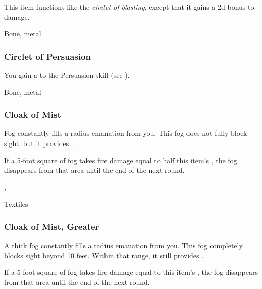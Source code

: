 This item functions like the \textit{circlet of blasting}, except that it gains a \plus2d bonus to damage.



 


 Bone, metal


\lowercase{\hypertarget{item:Circlet of Persuasion}{}}\label{item:Circlet of Persuasion}
\hypertarget{item:Circlet of Persuasion}{\subsubsection{Circlet of Persuasion\hfill{}}}

You gain a   to the Persuasion skill (see ).



 Bone, metal


\lowercase{\hypertarget{item:Cloak of Mist}{}}\label{item:Cloak of Mist}
\hypertarget{item:Cloak of Mist}{\subsubsection{Cloak of Mist\hfill{}}}

Fog constantly fills a \areamed radius emanation from you.
This fog does not fully block sight, but it provides \concealment.

If a 5-foot square of fog takes fire damage equal to half this item's , the fog disappears from that area until the end of the next round.



 , 


 Textiles


\lowercase{\hypertarget{item:Cloak of Mist, Greater}{}}\label{item:Cloak of Mist, Greater}
\hypertarget{item:Cloak of Mist, Greater}{\subsubsection{Cloak of Mist, Greater\hfill{}}}

A thick fog constantly fills a \areamed radius emanation from you.
This fog completely blocks sight beyond 10 feet.
Within that range, it still provides \concealment.

If a 5-foot square of fog takes fire damage equal to this item's , the fog disappears from that area until the end of the next round.



